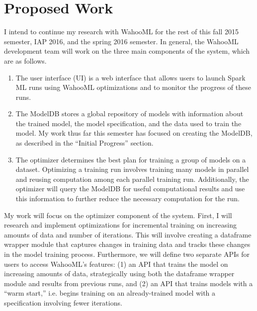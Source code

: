 \documentclass[../proposal.tex]{subfiles}
\begin{document}
\section{Proposed Work}

I intend to continue my research with WahooML for the rest of this fall 2015
semester, IAP 2016, and the spring 2016 semester. In general, the WahooML
development team will work on the three main components of the system, which
are as follows.

\begin{enumerate}[topsep=0pt,itemsep=-1ex,partopsep=1ex,parsep=1ex]

\item The user interface (UI) is a web interface that allows users to launch
Spark ML runs using WahooML optimizations and to monitor the progress of these
runs. 

\item The ModelDB stores a global repository of models with information about
the trained model, the model specification, and the data used to train the
model. My work thus far this semester has focused on creating the ModelDB, as
described in the ``Initial Progress'' section. 

\item The optimizer determines the best plan for training a group of models on
a dataset. Optimizing a training run involves training many models in parallel
and reusing computation among each parallel training run.  Additionally, the
optimizer will query the ModelDB for useful computational results and use this
information to further reduce the necessary computation for the run. 

\end{enumerate}

My work will focus on the optimizer component of the system. First, I will
research and implement optimizations for incremental training on increasing
amounts of data and number of iterations. This will involve creating a
dataframe wrapper module that captures changes in training data and tracks
these changes in the model training process. Furthermore, we will define two
separate APIs for users to access WahooML's features: (1) an API that trains
the model on increasing amounts of data, strategically using both the dataframe
wrapper module and results from previous runs, and (2) an API that trains
models with a ``warm start,'' i.e. begins training on an already-trained model
with a specification involving fewer iterations. 
\end{document}
